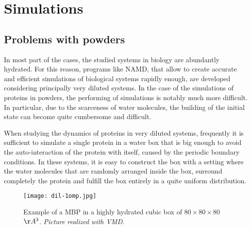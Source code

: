 \section{Simulations}
\subsection{Problems with powders}
In most part of the cases, the studied systems in biology are abundantly hydrated. For this reason, programs like NAMD, that allow to create accurate and efficient simulations of biological systems rapidly enough, are developed considering principally very diluted systems. In the case of the simulations of proteins in powders, the performing of simulations is notably much more difficult. In particular, due to the scarceness of water molecules, the building of the initial state can become quite cumbersome and difficult.

When studying the dynamics of proteins in very diluted systems, frequently it is sufficient to simulate a single protein in a water box that is big enough to avoid the auto-interaction of the protein with itself, caused by the periodic boundary conditions. In these systems, it is easy to construct the box with a setting where the water molecules that are randomly arranged inside the box, surround completely the protein and fulfill the box entirely in a quite uniform distribution.

\begin{figure}[H]
\centering
\begin{minipage}[t]{0.7\textwidth}
	\centering
    \texttt{[image: dil-1omp.jpg]}
    
    \footnotesize{\caption{Example of a MBP in a highly hydrated cubic box of $80 \times 80 \times 80$ $\AA^3$. \textit{Picture realized with VMD.}}
    \label{fig:diluted-syst}
    }
\end{minipage} 
\end{figure}

